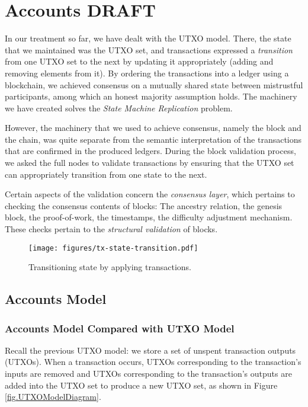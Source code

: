 \chapter{Accounts \small{\textsf{DRAFT}}}\label{chapter.accounts}

In our treatment so far, we have dealt with the UTXO model. There, the state
that we maintained was the UTXO set, and transactions expressed a \emph{transition}
from one UTXO set to the next by updating it appropriately (adding and removing elements from
it). By ordering the transactions into a ledger using a blockchain, we achieved
consensus on a mutually shared state between mistrustful participants, among
which an honest majority assumption holds. The machinery
we have created solves the \emph{State Machine Replication}
problem.

However, the machinery that we used to achieve consensus, namely the block and the chain,
was quite separate from the semantic interpretation of the transactions that are confirmed
in the produced ledgers. During the block validation process, we asked the full nodes
to validate transactions by ensuring that the UTXO set can appropriately transition
from one state to the next.

Certain aspects of the validation concern the \emph{consensus layer},
which pertains to checking the consensus contents of blocks: The ancestry relation,
the genesis block, the proof-of-work, the timestamps, the difficulty adjustment mechanism.
These checks pertain to the \emph{structural validation} of blocks.

\begin{figure}[h]
  \centering
  \texttt{[image: figures/tx-state-transition.pdf]}
  \caption{Transitioning state by applying transactions.}
  \label{fig.state-transition}
\end{figure}

\section{Accounts Model}

\subsection{Accounts Model Compared with UTXO Model}
Recall the previous UTXO model: we store a set of unspent transaction outputs (UTXOs). When a transaction occurs, UTXOs corresponding to the transaction's inputs are removed and UTXOs corresponding to the transaction's outputs are added into the UTXO set to produce a new UTXO set, as shown in Figure \ref{fig.UTXOModelDiagram}.

